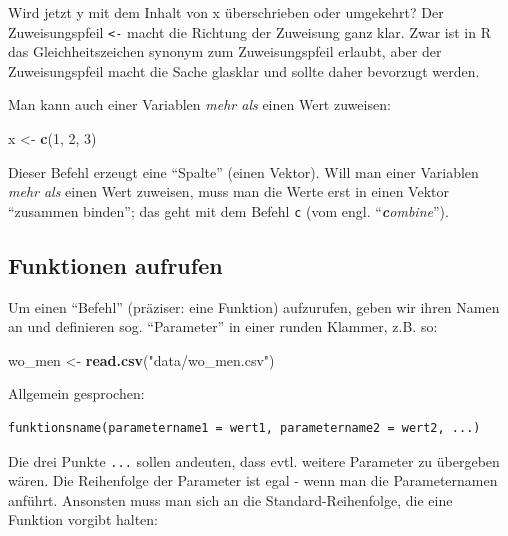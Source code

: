 \documentclass[12pt,ngerman,]{book}
\makeatletter
\newenvironment{Shaded}{\begin{snugshade}}{\end{snugshade}}
\newcommand{\KeywordTok}[1]{\textcolor[rgb]{0.13,0.29,0.53}{\textbf{{#1}}}}
\newcommand{\DecValTok}[1]{\textcolor[rgb]{0.00,0.00,0.81}{{#1}}}
\newcommand{\StringTok}[1]{\textcolor[rgb]{0.31,0.60,0.02}{{#1}}}
\newcommand{\NormalTok}[1]{{#1}}
\newenvironment{kframe}{%
\medskip{}
\setlength{\fboxsep}{.8em}
 \def\at@end@of@kframe{}%
 \ifinner\ifhmode%
  \def\at@end@of@kframe{\end{minipage}}%
  \begin{minipage}{\columnwidth}%
 \fi\fi%
 \def\FrameCommand##1{\hskip\@totalleftmargin \hskip-\fboxsep
 \colorbox{shadecolor}{##1}\hskip-\fboxsep
     \hskip-\linewidth \hskip-\@totalleftmargin \hskip\columnwidth}%
 \MakeFramed {\advance\hsize-\width
   \@totalleftmargin\z@ \linewidth\hsize
   \@setminipage}}%
 {\par\unskip\endMakeFramed%
 \at@end@of@kframe}
\renewenvironment{Shaded}{\begin{kframe}}{\end{kframe}}
\makeatother
\begin{document}
Wird jetzt y mit dem Inhalt von x überschrieben oder umgekehrt? Der
Zuweisungspfeil \texttt{\textless{}-} macht die Richtung der Zuweisung
ganz klar. Zwar ist in R das Gleichheitszeichen synonym zum
Zuweisungspfeil erlaubt, aber der Zuweisungspfeil macht die Sache
glasklar und sollte daher bevorzugt werden.

Man kann auch einer Variablen \emph{mehr als} einen Wert zuweisen:

\begin{Shaded}
\begin{Highlighting}[]
\NormalTok{x <-}\StringTok{ }\KeywordTok{c}\NormalTok{(}\DecValTok{1}\NormalTok{, }\DecValTok{2}\NormalTok{, }\DecValTok{3}\NormalTok{)}
\end{Highlighting}
\end{Shaded}

Dieser Befehl erzeugt eine ``Spalte'' (einen Vektor). Will man einer
Variablen \emph{mehr als} einen Wert zuweisen, muss man die Werte erst
in einen Vektor ``zusammen binden''; das geht mit dem Befehl \texttt{c}
(vom engl. ``\emph{\textbf{c}ombine}'').

\subsection{Funktionen aufrufen}\label{funktionen-aufrufen}

Um einen ``Befehl'' (präziser: eine Funktion) aufzurufen, geben wir
ihren Namen an und definieren sog. ``Parameter'' in einer runden
Klammer, z.B. so:

\begin{Shaded}
\begin{Highlighting}[]
\NormalTok{wo_men <-}\StringTok{ }\KeywordTok{read.csv}\NormalTok{(}\StringTok{"data/wo_men.csv"}\NormalTok{)}
\end{Highlighting}
\end{Shaded}

Allgemein gesprochen:

\begin{verbatim}
funktionsname(parametername1 = wert1, parametername2 = wert2, ...)
\end{verbatim}

Die drei Punkte \texttt{...} sollen andeuten, dass evtl. weitere
Parameter zu übergeben wären. Die Reihenfolge der Parameter ist egal -
wenn man die Parameternamen anführt. Ansonsten muss man sich an die
Standard-Reihenfolge, die eine Funktion vorgibt halten:
\end{document}
